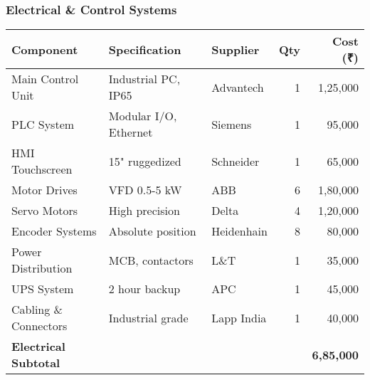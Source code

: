 \documentclass[11pt,a4paper]{article}
\begin{document}
\subsubsection{Electrical \& Control Systems}
\begin{center}
\small
\begin{tabular}{lllrr}
\toprule
\textbf{Component} & \textbf{Specification} & \textbf{Supplier} & \textbf{Qty} & \textbf{Cost (₹)} \\
\midrule
Main Control Unit & Industrial PC, IP65 & Advantech & 1 & 1,25,000 \\
PLC System & Modular I/O, Ethernet & Siemens & 1 & 95,000 \\
HMI Touchscreen & 15" ruggedized & Schneider & 1 & 65,000 \\
Motor Drives & VFD 0.5-5 kW & ABB & 6 & 1,80,000 \\
Servo Motors & High precision & Delta & 4 & 1,20,000 \\
Encoder Systems & Absolute position & Heidenhain & 8 & 80,000 \\
Power Distribution & MCB, contactors & L\&T & 1 & 35,000 \\
UPS System & 2 hour backup & APC & 1 & 45,000 \\
Cabling \& Connectors & Industrial grade & Lapp India & 1 & 40,000 \\
\midrule
\textbf{Electrical Subtotal} & & & & \textbf{6,85,000} \\
\bottomrule
\end{tabular}
\end{center}
\end{document}
